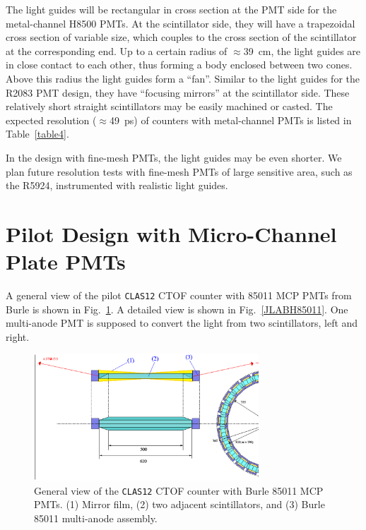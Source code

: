The light guides will be rectangular in cross section at the PMT side for 
the metal-channel H8500 PMTs.  At the scintillator side, they will have a 
trapezoidal cross section of variable size, which couples to the cross section 
of the scintillator at the corresponding end.  Up to a certain radius of 
$\approx$39~cm, the light guides are in close contact to each other, thus 
forming a body enclosed between two cones. Above this radius the light guides 
form a ``fan''.  Similar to the light guides for the R2083 PMT design, they 
have ``focusing mirrors'' at the scintillator side.  These relatively short 
straight scintillators may be easily machined or casted.  The expected 
resolution ($\approx$49~ps) of counters with metal-channel PMTs is listed in 
Table~\ref{table4}.

In the design with fine-mesh PMTs, the light guides may be even shorter.
We plan future resolution tests with fine-mesh PMTs of large sensitive area, 
such as the R5924, instrumented with realistic light guides.

\section{Pilot Design with Micro-Channel Plate PMTs}
\label{des85011}

A general view of the pilot {\tt CLAS12} CTOF counter with 85011 MCP PMTs 
from Burle is shown in Fig.~\ref{JLABt0H85011}.  A detailed view is shown in  
Fig.~\ref{JLABH85011}.  One multi-anode PMT is supposed to convert the light 
from two scintillators, left and right.  

\begin{figure} [htbp]
\centering
\includegraphics[width=0.75\textwidth]{JLABt0H85011.ps}
\caption{\small{General view of the {\tt CLAS12} CTOF counter with 
Burle 85011 MCP PMTs.  (1) Mirror film, (2) two adjacent scintillators,
and (3) Burle 85011 multi-anode assembly.}}
\label{JLABt0H85011}
\end{figure}

